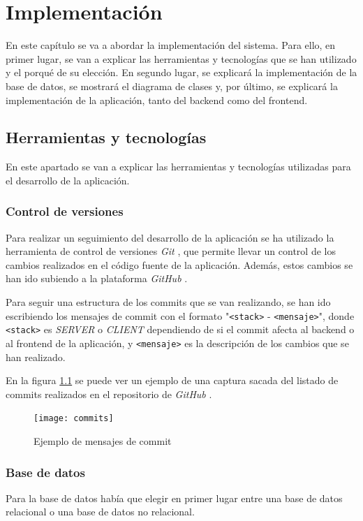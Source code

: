 \chapter{Implementación}
En este capítulo se va a abordar la implementación del sistema. Para ello, en
primer lugar, se van a explicar las herramientas y tecnologías que se han utilizado
y el porqué de su elección. En segundo lugar, se explicará la implementación de la
base de datos, se mostrará el diagrama de clases y, por último, se explicará la
implementación de la aplicación, tanto del backend como del frontend.

\section{Herramientas y tecnologías}
En este apartado se van a explicar las herramientas y tecnologías utilizadas
para el desarrollo de la aplicación.

\subsection{Control de versiones}
Para realizar un seguimiento del desarrollo de la aplicación se ha utilizado la
herramienta de control de versiones \textit{Git} \cite{git}, que permite llevar un
control de los cambios realizados en el código fuente de la aplicación. Además, estos
cambios se han ido subiendo a la plataforma \textit{GitHub} \cite{github}.

Para seguir una estructura de los commits que se van realizando, se han ido escribiendo
los mensajes de commit con el formato "\texttt{<stack>} - \texttt{<mensaje>}", donde
\texttt{<stack>} es \textit{SERVER} o \textit{CLIENT} dependiendo de si el commit afecta
al backend o al frontend de la aplicación, y \texttt{<mensaje>} es la descripción de los
cambios que se han realizado.

En la figura \ref{fig:commits} se puede ver un ejemplo de una captura sacada
del listado de commits realizados en el repositorio de \textit{GitHub} \cite{github}.

\begin{figure}[H]
  \centering
  \texttt{[image: commits]}
  \caption{Ejemplo de mensajes de commit}
  \label{fig:commits}
\end{figure}

\subsection{Base de datos}
Para la base de datos había que elegir en primer lugar entre una base de datos
relacional o una base de datos no relacional.

